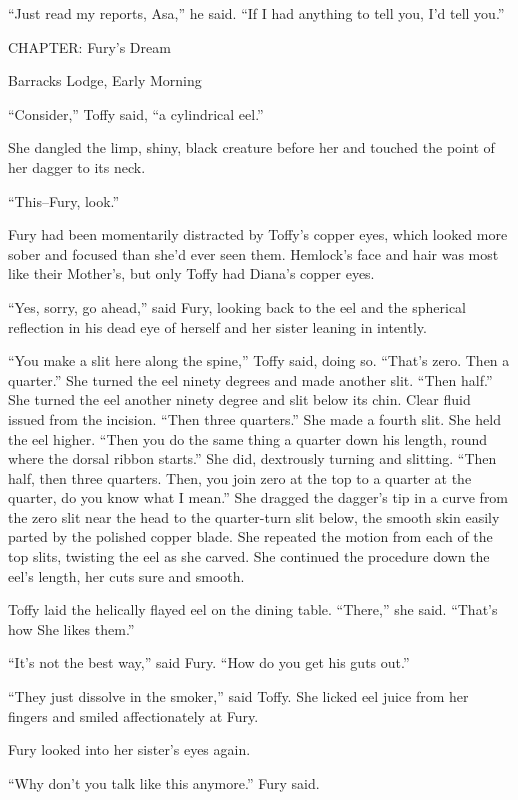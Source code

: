 \documentclass[11pt,a5paper]{article}
\begin{document}
``Just read my reports, Asa,'' he said. ``If I had anything to tell you, I'd tell you.''

CHAPTER: Fury's Dream

Barracks Lodge, Early Morning



``Consider,'' Toffy said, ``a cylindrical eel.''

She dangled the limp, shiny, black creature before her and touched the point of her dagger to its neck.

``This--Fury, look.''

Fury had been momentarily distracted by Toffy's copper eyes, which looked more sober and focused than she'd ever seen them. Hemlock's face and hair was most like their Mother's, but only Toffy had Diana's copper eyes.

``Yes, sorry, go ahead,'' said Fury, looking back to the eel and the spherical reflection in his dead eye of herself and her sister leaning in intently.

``You make a slit here along the spine,'' Toffy said, doing so. ``That's zero. Then a quarter.'' She turned the eel ninety degrees and made another slit. ``Then half.'' She turned the eel another ninety degree and slit below its chin. Clear fluid issued from the incision. ``Then three quarters.'' She made a fourth slit. She held the eel higher. ``Then you do the same thing a quarter down his length, round where the dorsal ribbon starts.'' She did, dextrously turning and slitting. ``Then half, then three quarters. Then, you join zero at the top to a quarter at the quarter, do you know what I mean.'' She dragged the dagger's tip in a curve from the zero slit near the head to the quarter-turn slit below, the smooth skin easily parted by the polished copper blade. She repeated the motion from each of the top slits, twisting the eel as she carved. She continued the procedure down the eel's length, her cuts sure and smooth.

Toffy laid the helically flayed eel on the dining table. ``There,'' she said. ``That's how She likes them.''

``It's not the best way,'' said Fury. ``How do you get his guts out.''

``They just dissolve in the smoker,'' said Toffy. She licked eel juice from her fingers and smiled affectionately at Fury.

Fury looked into her sister's eyes again.

``Why don't you talk like this anymore.'' Fury said.
\end{document}
